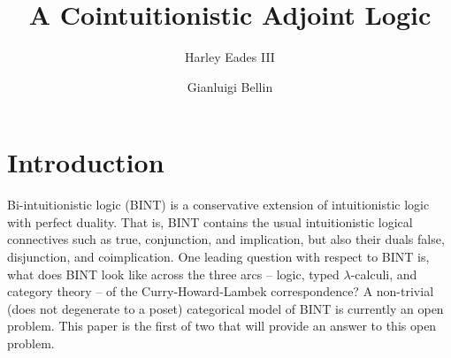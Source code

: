 \documentclass{lmcs}
\date{}
\begin{document}
\title{A Cointuitionistic Adjoint Logic}
\author{Harley Eades III}
\address{Computer Science, Augusta University, Augusta, GA}

\author{Gianluigi Bellin}
\address{Dipartimento di Informatica, Universit\`{a} di Verona, Strada Le Grazie, 37134 Verona, Italy}

\maketitle 

\begin{abstract}

  

\end{abstract}

\section{Introduction}
\label{sec:introduction}
Bi-intuitionistic logic (BINT) is a conservative extension of
intuitionistic logic with perfect duality.  That is, BINT contains the
usual intuitionistic logical connectives such as true, conjunction,
and implication, but also their duals false, disjunction, and
coimplication. One leading question with respect to BINT is, what does
BINT look like across the three arcs -- logic, typed
$\lambda$-calculi, and category theory -- of the Curry-Howard-Lambek
correspondence?  A non-trivial (does not degenerate to a poset)
categorical model of BINT is currently an open problem.  This paper is
the first of two that will provide an answer to this open problem.
\end{document}
